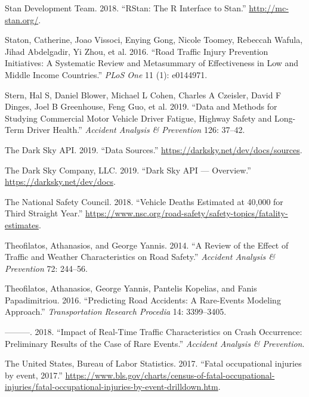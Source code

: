 \documentclass[12pt]{book}
\numberwithin{equation}{chapter}
\begin{document}
\leavevmode\hypertarget{ref-rstancitation}{}%
Stan Development Team. 2018. ``RStan: The R Interface to Stan.'' \url{http://mc-stan.org/}.

\leavevmode\hypertarget{ref-staton2016road}{}%
Staton, Catherine, Joao Vissoci, Enying Gong, Nicole Toomey, Rebeccah Wafula, Jihad Abdelgadir, Yi Zhou, et al. 2016. ``Road Traffic Injury Prevention Initiatives: A Systematic Review and Metasummary of Effectiveness in Low and Middle Income Countries.'' \emph{PLoS One} 11 (1): e0144971.

\leavevmode\hypertarget{ref-stern2019data}{}%
Stern, Hal S, Daniel Blower, Michael L Cohen, Charles A Czeisler, David F Dinges, Joel B Greenhouse, Feng Guo, et al. 2019. ``Data and Methods for Studying Commercial Motor Vehicle Driver Fatigue, Highway Safety and Long-Term Driver Health.'' \emph{Accident Analysis \& Prevention} 126: 37--42.

\leavevmode\hypertarget{ref-darkskyds}{}%
The Dark Sky API. 2019. ``Data Sources.'' \url{https://darksky.net/dev/docs/sources}.

\leavevmode\hypertarget{ref-darksky}{}%
The Dark Sky Company, LLC. 2019. ``Dark Sky API --- Overview.'' \url{https://darksky.net/dev/docs}.

\leavevmode\hypertarget{ref-nsc2018}{}%
The National Safety Council. 2018. ``Vehicle Deaths Estimated at 40,000 for Third Straight Year.'' \url{https://www.nsc.org/road-safety/safety-topics/fatality-estimates}.

\leavevmode\hypertarget{ref-theofilatos2014review}{}%
Theofilatos, Athanasios, and George Yannis. 2014. ``A Review of the Effect of Traffic and Weather Characteristics on Road Safety.'' \emph{Accident Analysis \& Prevention} 72: 244--56.

\leavevmode\hypertarget{ref-theofilatos2016predicting}{}%
Theofilatos, Athanasios, George Yannis, Pantelis Kopelias, and Fanis Papadimitriou. 2016. ``Predicting Road Accidents: A Rare-Events Modeling Approach.'' \emph{Transportation Research Procedia} 14: 3399--3405.

\leavevmode\hypertarget{ref-theofilatos2018impact}{}%
---------. 2018. ``Impact of Real-Time Traffic Characteristics on Crash Occurrence: Preliminary Results of the Case of Rare Events.'' \emph{Accident Analysis \& Prevention}.

\leavevmode\hypertarget{ref-bols}{}%
The United States, Bureau of Labor Statistics. 2017. ``Fatal occupational injuries by event, 2017.'' \url{https://www.bls.gov/charts/census-of-fatal-occupational-injuries/fatal-occupational-injuries-by-event-drilldown.htm}.
\end{document}
